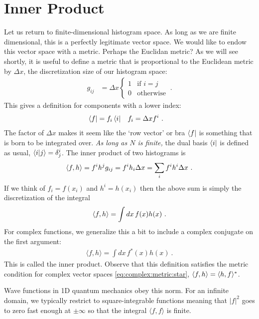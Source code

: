 \section{Inner Product}

Let us return to finite-dimensional histogram space. As long as we are finite dimensional, this is a perfectly legitimate vector space. We would like to endow this vector space with a metric. Perhaps the Euclidan metric? As we will see shortly, it is useful to define a metric that is proportional to the Euclidean metric by $\Delta x$, the discretization size of our histogram space:
\begin{align}
    g_{ij} &=
    \Delta x 
    \begin{cases}
    1 & \text{if } i=j \\
    0 & \text{otherwise}
    \end{cases}
    \ .
    \label{eq:metric:on:histogram:space}
\end{align}
This gives a definition for components with a lower index:
\begin{align}
    \left\langle f\right| &= f_i\left\langle i\right| & f_i &= \Delta x f^i \ .
    \label{eqref:histogram:row:vec}
\end{align}
The factor of $\Delta x$ makes it seem like the `row vector' or bra $\left\langle f\right|$ is something that is born to be integrated over. \emph{As long as $N$ is finite,} the dual basis $\left\langle i\right|$ is defined as usual, $\langle i | j \rangle = \delta^i_j$. The inner product of two histograms is
\begin{align}
    \langle f , h \rangle = f^i h^j g_{ij} = f^i h_i \Delta x = \sum_i f^i h^i \Delta x \ .
    \label{eq:metric:on:histogram:space:bracket:form}
\end{align}
If we think of $f_i = f(x_i)$ and $h^i=h(x_i)$ then the above sum is simply the discretization of the integral
\begin{align}
    \langle f , h \rangle = \int dx\, f(x)h(x) \ .
\end{align}
For complex functions, we generalize this a bit to include a complex conjugate on the first argument:
\begin{align}
  \langle f,h\rangle 
  =
  \int dx\, f^*(x)h(x) \ .
  \label{eq:L2:inner:product}
\end{align}
This is called the  inner product. Observe that this definition satisfies the metric condition for complex vector spaces \eqref{eq:complex:metric:star}, $\langle f, h\rangle = \langle h, f \rangle^* $.
\begin{example}
Wave functions in 1D quantum mechanics obey this norm. For an infinite domain, we typically restrict to square-integrable functions meaning that $|f|^2$ goes to zero fast enough at $\pm \infty$ so that the integral $\langle f, f\rangle$ is finite. 
\end{example}
